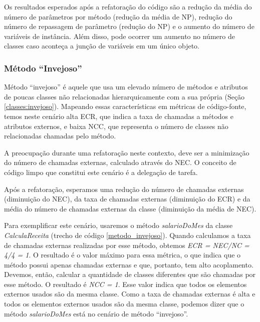 Os resultados esperados após a refatoração do código são a redução da média do número de parâmetros por método (redução da média de NP), redução do número de repassagem de parâmetro (redução do NP) e o aumento do número de variáveis de instância. Além disso, pode ocorrer um aumento no número de classes caso aconteça a junção de variáveis em um único objeto.	           


\subsubsection{Método ``Invejoso''}
\label{cenario_metodo_invejoso}
	
Método ``invejoso'' é aquele que usa um elevado número de métodos e atributos de poucas classes não relacionadas hierarquicamente com a sua própria (Seção \ref{classes:invejoso}). Mapeando essas características em métricas de código-fonte, temos neste cenário alta ECR, que indica a taxa de chamadas a métodos e atributos externos, e baixa NCC, que representa o número de classes não relacionadas chamadas pelo método.
	
A preocupação durante uma refatoração neste contexto, deve ser a minimização do número de chamadas externas, calculado através do NEC. O conceito de código limpo que constitui este cenário é a delegação de tarefa.
	
Após a refatoração, esperamos uma redução do número de chamadas externas (diminuição do NEC), da taxa de chamadas externas (diminuição do ECR) e da média do número de chamadas externas da classe (diminuição da média de NEC).
                      
Para exemplificar este cenário, usaremos o método \textit{salarioDoMes} da classe \textit{CalculaReceita} (trecho de código \ref{metodo_invejoso}). Quando calculamos a taxa de chamadas externas realizadas por esse método, obtemos \textit{ECR = NEC/NC = 4/4 = 1}. O resultado é o valor máximo para essa métrica, o que indica que o método possui apenas chamadas externas e que, portanto, tem alto acoplamento. Devemos, então, calcular a quantidade de classes diferentes que são chamadas por esse método. O resultado é \textit{NCC = 1}. Esse valor indica que todos os elementos externos usados são da mesma classe. Como a taxa de chamadas externas é alta e todos os elementos externos usados são da mesma classe, podemos dizer que o método \textit{salarioDoMes} está no cenário de método ``invejoso''.

                                      

